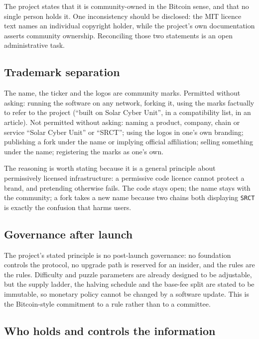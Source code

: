 \documentclass{article}
\begin{document}
The project states that it is community-owned in the Bitcoin sense, and that no
single person holds it. One inconsistency should be disclosed: the MIT licence
text names an individual copyright holder, while the project's own
documentation asserts community ownership. Reconciling those two statements is
an open administrative task.

\subsection{Trademark separation}

The name, the ticker and the logos are community marks. Permitted without
asking: running the software on any network, forking it, using the marks
factually to refer to the project (``built on Solar Cyber Unit'', in a compatibility list,
in an article). Not permitted without asking: naming a product, company, chain
or service ``Solar Cyber Unit'' or ``SRCT''; using the logos in one's own branding;
publishing a fork under the name or implying official affiliation; selling
something under the name; registering the marks as one's own.

The reasoning is worth stating because it is a general principle about
permissively licensed infrastructure: a permissive code licence cannot protect
a brand, and pretending otherwise fails. The code stays open; the name stays
with the community; a fork takes a new name because two chains both displaying
\texttt{SRCT} is exactly the confusion that harms users.

\subsection{Governance after launch}

The project's stated principle is no post-launch governance: no foundation
controls the protocol, no upgrade path is reserved for an insider, and the
rules are the rules. Difficulty and puzzle parameters are already designed to
be adjustable, but the supply ladder, the halving schedule and the base-fee
split are stated to be immutable, so monetary policy cannot be changed by a
software update. This is the Bitcoin-style commitment to a rule rather than to
a committee.

\subsection{Who holds and controls the information}
\end{document}
